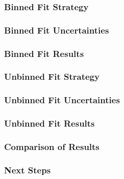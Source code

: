 \documentclass{beamer}
\newcommand{\beginbackup}{
  \newcounter{framenumbervorappendix}
  \setcounter{framenumbervorappendix}{\value{framenumber}}
}
\newcommand{\backupend}{
  \addtocounter{framenumbervorappendix}{-\value{framenumber}}
  \addtocounter{framenumber}{\value{framenumbervorappendix}}
}
\begin{document}
\begin{frame}
  \frametitle{Binned Fit Strategy}

\end{frame}


\begin{frame}
  \frametitle{Binned Fit Uncertainties}

\end{frame}


\begin{frame}
  \frametitle{Binned Fit Results}

\end{frame}


\begin{frame}
  \frametitle{Unbinned Fit Strategy}

\end{frame}


\begin{frame}
  \frametitle{Unbinned Fit Uncertainties}

\end{frame}


\begin{frame}
  \frametitle{Unbinned Fit Results}

\end{frame}


\begin{frame}
  \frametitle{Comparison of Results}

\end{frame}


\begin{frame}
  \frametitle{Next Steps}

\end{frame}


\begin{comment}
\beginbackup

\begin{frame}
  \centering
    {\Huge \bf\sffamily Backup Slides}
\end{frame}



\backupend
\end{comment}
\end{document}
